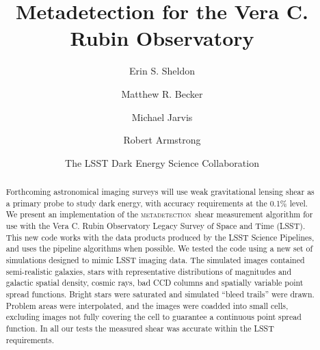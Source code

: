 \documentclass[twocolumn,twocolappendix,astrosym]{openjournal}
\newcommand{\dm}{LSST Science Pipelines}
\newcommand{\mdet}{\textsc{metadetection}}
\newcommand{\Mcal}{\textsc{Metacalibration}}
\newcommand{\Mdet}{\textsc{Metadetection}}
\begin{document}



\title{Metadetection for the Vera C. Rubin Observatory}

\author{Erin S. Sheldon}
\author{Matthew R. Becker}
\author{Michael Jarvis}
\author{Robert Armstrong}
\author{The LSST Dark Energy Science Collaboration}


\begin{abstract}

        Forthcoming astronomical imaging surveys will use weak gravitational
        lensing shear as a primary probe to study dark energy, with accuracy
        requirements at the 0.1\% level.  We present an implementation of the
        \mdet\ shear measurement algorithm for use with the Vera C. Rubin
        Observatory Legacy Survey of Space and Time (LSST).  This new code
        works with the data products produced by the \dm, and uses the pipeline
        algorithms when possible.  We tested the code using a new set of
        simulations designed to mimic LSST imaging data.  The simulated images
        contained semi-realistic galaxies, stars with representative
        distributions of magnitudes and galactic spatial density, cosmic rays,
        bad CCD columns and spatially variable point spread functions.  Bright
        stars were saturated and simulated ``bleed trails'' were drawn.
        Problem areas were interpolated, and the images were coadded into small
        cells, excluding images not fully covering the cell to guarantee a
        continuous point spread function.  In all our tests the measured shear
        was accurate within the LSST requirements.



\end{abstract}
\end{document}
